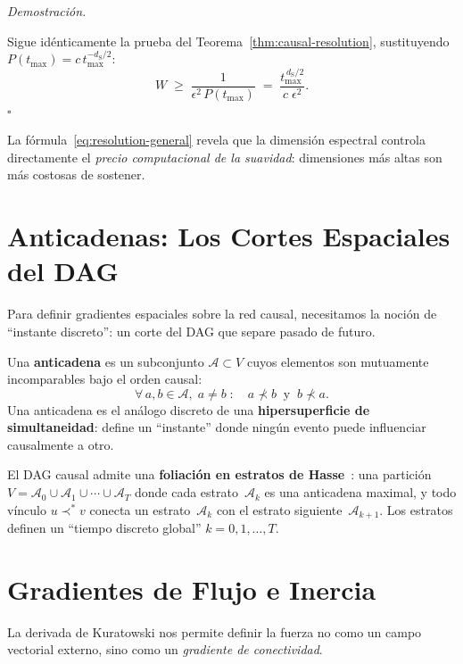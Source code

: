 \documentclass[11pt, a4paper, openany]{book}
\newcommand{\dS}{d_{\mathrm{S}}}
\newcommand{\covers}{\prec^{\!*}}
\renewenvironment{proof}[1][Demostraci\'on]{%
  \par\noindent\textit{#1.}\quad
}{\hfill$\square$\par\medskip}
\begin{document}
\begin{proof}
Sigue id\'enticamente la prueba del
Teorema~\ref{thm:causal-resolution}, sustituyendo
$P(t_{\max}) = c\,t_{\max}^{-\dS/2}$:
\[
  W \;\geq\; \frac{1}{\epsilon^2\,P(t_{\max})}
  \;=\; \frac{t_{\max}^{\,\dS/2}}{c\;\epsilon^2}.
\]
\end{proof}

\noindent
La f\'ormula~\eqref{eq:resolution-general} revela que la
dimensi\'on espectral controla directamente el
\emph{precio computacional de la suavidad}: dimensiones m\'as altas
son m\'as costosas de sostener.

\section{Anticadenas: Los Cortes Espaciales del DAG}

Para definir gradientes espaciales sobre la red causal, necesitamos
la noci\'on de ``instante discreto'': un corte del DAG que separe
pasado de futuro.

\begin{definition}[Anticadena]
\label{def:antichain}
Una \textbf{anticadena} es un subconjunto $\mathcal{A} \subset V$
cuyos elementos son mutuamente incomparables bajo el orden causal:
\[
  \forall\, a, b \in \mathcal{A},\;a \neq b
  \;\colon\quad
  a \nprec b \;\;\text{y}\;\; b \nprec a.
\]
Una anticadena es el an\'alogo discreto de una
\textbf{hipersuperficie de simultaneidad}: define un ``instante''
donde ning\'un evento puede influenciar causalmente a otro.
\end{definition}

\noindent
El DAG causal admite una \textbf{foliaci\'on en estratos de
Hasse}~\cite{rideout2000,surya2019}: una partici\'on
$V = \mathcal{A}_0 \cup \mathcal{A}_1 \cup \cdots \cup
\mathcal{A}_T$ donde cada estrato~$\mathcal{A}_k$ es una anticadena
maximal, y todo v\'inculo $u \covers v$ conecta un
estrato~$\mathcal{A}_k$ con el estrato siguiente~$\mathcal{A}_{k+1}$.
Los estratos definen un ``tiempo discreto global'' $k = 0, 1,
\ldots, T$.

\section{Gradientes de Flujo e Inercia}

La derivada de Kuratowski nos permite definir la fuerza no como un
campo vectorial externo, sino como un \emph{gradiente de
conectividad}.
\end{document}
